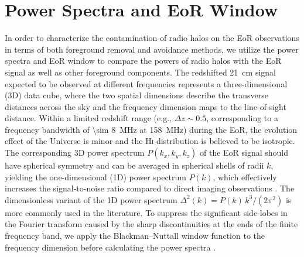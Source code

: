 \documentclass[twocolumn]{aastex62}
\newcommand{\Hi}{H\textsc{i}}
\begin{document}
\section{Power Spectra and EoR Window}
\label{sec:ps-eorw}

In order to characterize the contamination of radio halos on the EoR
observations in terms of both foreground removal and avoidance methods,
we utilize the power spectra and EoR window to compare the powers of
radio halos with the EoR signal as well as other foreground components.
The redshifted 21~cm signal expected to be observed at different
frequencies represents a three-dimensional (3D) data cube, where the
two spatial dimensions describe the transverse distances across the sky
and the frequency dimension maps to the line-of-sight distance.
Within a limited redshift range (e.g., $\Delta z \sim 0.5$, corresponding
to a frequency bandwidth of \SI{\sim 8}{\MHz} at \SI{158}{\MHz})
during the EoR, the evolution effect of the Universe is minor and the
\Hi{} distribution is believed to be isotropic.
The corresponding 3D power spectrum $P(k_x, k_y, k_z)$ of the EoR signal
should have spherical symmetry and can be averaged in spherical shells
of radii $k$, yielding the one-dimensional (1D) power spectrum $P(k)$,
which effectively increases the signal-to-noise ratio compared to
direct imaging observations \citep{morales2004,morales2006,datta2010}.
The dimensionless variant of the 1D power spectrum
$\Delta^2(k) = P(k) \,k^3 / (2\pi^2)$
is more commonly used in the literature.
To suppress the significant side-lobes in the Fourier transform caused
by the sharp discontinuities at the ends of the finite frequency band,
we apply the Blackman--Nuttall window function to the frequency dimension
before calculating the power spectra \citep[e.g.,][]{trott2015,chapman2016}.
\end{document}
